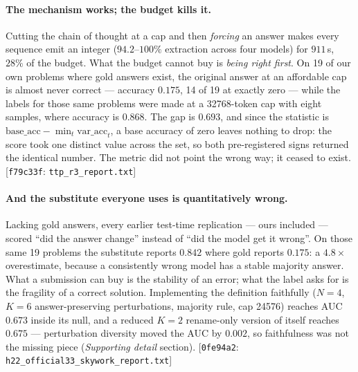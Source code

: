 \documentclass[10pt]{article}
\newcommand{\cmt}[2]{{\footnotesize\textsf{[}\texttt{#1}\textsf{:} #2\textsf{]}}}
\begin{document}
\paragraph{The mechanism works; the budget kills it.} Cutting the chain of thought at a cap and then
\emph{forcing} an answer makes every sequence emit an integer ($94.2$--$100\%$ extraction across four
models) for $911$\,s, $28\%$ of the budget. What the budget cannot buy is \emph{being right first}.
On 19 of our own problems where gold answers exist, the original answer at an affordable cap is
almost never correct --- accuracy $\mathbf{0.175}$, 14 of 19 at exactly zero --- while the labels for
those same problems were made at a 32768-token cap with eight samples, where accuracy is
$\mathbf{0.868}$. The gap is $\mathbf{0.693}$, and since the statistic is
$\text{base\_acc} - \min_t \text{var\_acc}_t$, a base accuracy of zero leaves nothing to drop: the
score took one distinct value across the set, so both pre-registered signs returned the identical
number. The metric did not point the wrong way; it ceased to exist.
\cmt{f79c33f}{\texttt{ttp\_r3\_report.txt}}

\paragraph{And the substitute everyone uses is quantitatively wrong.} Lacking gold answers, every
earlier test-time replication --- ours included --- scored ``did the answer change'' instead of ``did
the model get it wrong''. On those same 19 problems the substitute reports $0.842$ where gold reports
$0.175$: a $\mathbf{4.8\times}$ overestimate, because a consistently wrong model has a stable
majority answer. What a submission can buy is the stability of an error; what the label asks for is
the fragility of a correct solution. Implementing the definition faithfully ($N{=}4$, $K{=}6$
answer-preserving perturbations, majority rule, cap 24576) reaches AUC $0.673$ inside its null, and a
reduced $K{=}2$ rename-only version of itself reaches $0.675$ --- perturbation diversity moved the
AUC by $0.002$, so faithfulness was not the missing piece (\emph{Supporting detail} section).
\cmt{0fe94a2}{\texttt{h22\_official33\_skywork\_report.txt}}
\end{document}
